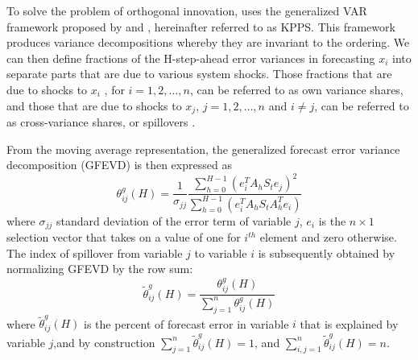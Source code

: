 \documentclass[preprint, 3p,
authoryear]{elsarticle} %
\begin{document}
To solve the problem of orthogonal innovation,
\citet{diebold_better_2012} uses the generalized VAR framework proposed
by \citet{koop_impulse_1996} and \citet{pesaran_generalized_1998},
hereinafter referred to as KPPS. This framework produces variance
decompositions whereby they are invariant to the ordering. We can then
define fractions of the H-step-ahead error variances in forecasting
\(x_i\) into separate parts that are due to various system shocks. Those
fractions that are due to shocks to \(x_i\) , for \(i=1,2,\dots,n\), can
be referred to as own variance shares, and those that are due to shocks
to \(x_j\), \(j=1,2,\dots,n\) and \(i\neq j\), can be referred to as
cross-variance shares, or spillovers
\citep{diebold_better_2012, yang_idiosyncratic_2022, tan_how_2020, susilo_covid-19_2022}.

From the moving average representation, the generalized forecast error
variance decomposition (GFEVD) is then expressed as \begin{equation}
\theta_{ij}^g(H) = \frac{1}{\sigma_{jj}} \frac{\displaystyle\sum_{h=0}^{H-1}(e_i^TA_hS_te_j)^2}{\displaystyle\sum_{h=0}^{H-1}(e_i^TA_hS_tA_h^Te_i)}
\end{equation} where \(\sigma_{jj}\) standard deviation of the error
term of variable \(j\), \(e_i\) is the \(n \times 1\) selection vector
that takes on a value of one for \(i^{th}\) element and zero otherwise.
The index of spillover from variable \(j\) to variable \(i\) is
subsequently obtained by normalizing GFEVD by the row sum:
\begin{equation}
\tilde{\theta}_{ij}^g(H) = \frac{\theta_{ij}^g(H)}{\displaystyle\sum_{j=1}^n\theta_{ij}^g(H)}
\end{equation} where \(\tilde{\theta}_{ij}^g(H)\) is the percent of
forecast error in variable \(i\) that is explained by variable \(j\),and
by construction \(\sum_{j=1}^n\tilde{\theta}_{ij}^g(H) = 1\), and
\(\sum_{i,j=1}^n\tilde{\theta}_{ij}^g(H) = n\).
\end{document}
